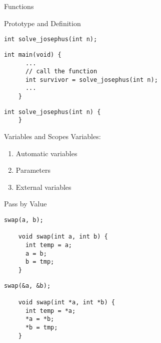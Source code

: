 \begin{frame}{}
  \centerline{\LARGE Functions}
\end{frame}

\begin{frame}[fragile]{Prototype and Definition}
  \begin{lstlisting}[style = Cstyle]
    int solve_josephus(int n);
  \end{lstlisting}

  \vspace{0.20cm}

  \vspace{0.20cm}
  \begin{lstlisting}[style = Cstyle]
    int main(void) {
      ...
      // call the function
      int survivor = solve_josephus(int n);
      ...
    }
  \end{lstlisting}

  \vspace{0.20cm}
  \begin{lstlisting}[style = Cstyle]
    int solve_josephus(int n) {
    }
  \end{lstlisting}
\end{frame}

\begin{frame}[fragile]{Variables and Scopes}
  Variables:
  \begin{enumerate}
    \item Automatic variables
    \item Parameters
    \item External variables
  \end{enumerate}

  \vspace{0.60cm}
  \pause
\end{frame}

\begin{frame}[fragile]{Pass by Value}
  \begin{lstlisting}[style = Cstyle]
    swap(a, b);

    void swap(int a, int b) {
      int temp = a;
      a = b;
      b = tmp;
    }
  \end{lstlisting}

  \vspace{0.40cm}
  \pause
  \begin{lstlisting}[style = Cstyle]
    swap(&a, &b);

    void swap(int *a, int *b) {
      int temp = *a;
      *a = *b;
      *b = tmp;
    }
  \end{lstlisting}

  \vspace{0.30cm}
  \pause
\end{frame}

